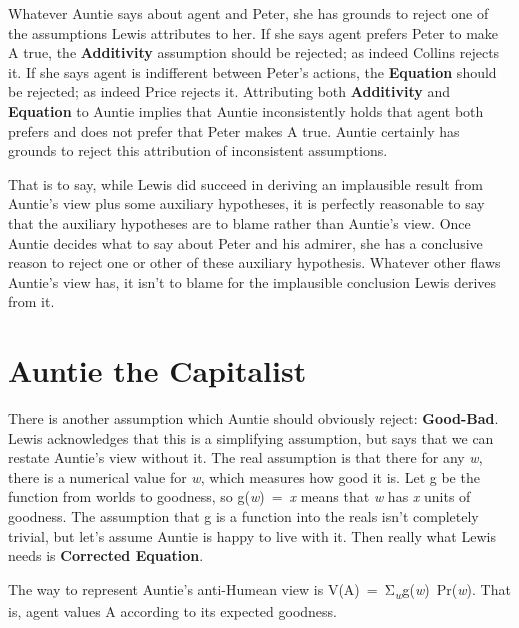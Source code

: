 \documentclass[
  11pt,
  letterpaper,
  DIV=11,
  numbers=noendperiod,
  twoside]{scrartcl}
\providecommand{\tightlist}{%
  \setlength{\itemsep}{0pt}\setlength{\parskip}{0pt}}\usepackage{longtable,booktabs,array}
\begin{document}
Whatever Auntie says about agent and Peter, she has grounds to reject
one of the assumptions Lewis attributes to her. If she says agent
prefers Peter to make A true, the \textbf{Additivity} assumption should
be rejected; as indeed Collins rejects it. If she says agent is
indifferent between Peter's actions, the \textbf{Equation} should be
rejected; as indeed Price rejects it. Attributing both
\textbf{Additivity} and \textbf{Equation} to Auntie implies that Auntie
inconsistently holds that agent both prefers and does not prefer that
Peter makes A true. Auntie certainly has grounds to reject this
attribution of inconsistent assumptions.

That is to say, while Lewis did succeed in deriving an implausible
result from Auntie's view plus some auxiliary hypotheses, it is
perfectly reasonable to say that the auxiliary hypotheses are to blame
rather than Auntie's view. Once Auntie decides what to say about Peter
and his admirer, she has a conclusive reason to reject one or other of
these auxiliary hypothesis. Whatever other flaws Auntie's view has, it
isn't to blame for the implausible conclusion Lewis derives from it.

\section{Auntie the Capitalist}\label{auntie-the-capitalist}

There is another assumption which Auntie should obviously reject:
\textbf{Good-Bad}. Lewis acknowledges that this is a simplifying
assumption, but says that we can restate Auntie's view without it. The
real assumption is that there for any \emph{w}, there is a numerical
value for \emph{w}, which measures how good it is. Let g be the function
from worlds to goodness, so g(\emph{w})~=~\emph{x} means that \emph{w}
has \emph{x} units of goodness. The assumption that g is a function into
the reals isn't completely trivial, but let's assume Auntie is happy to
live with it. Then really what Lewis needs is \textbf{Corrected
Equation}.

\begin{description}
\tightlist
\item[Corrected Equation]
The way to represent Auntie's anti-Humean view is
\newline V(A)~=~Σ\textsubscript{\emph{w}}g(\emph{w})~Pr(\emph{w}). That
is, agent values A according to its expected goodness.
\end{description}
\end{document}
